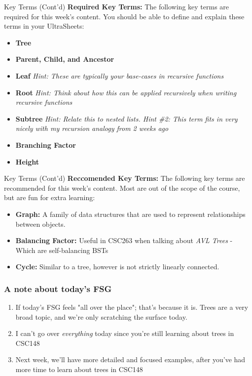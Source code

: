 \documentclass[hyperref={colorlinks,citecolor=blue,linkcolor=blue,urlcolor=blue}, aspectratio=1610]{beamer}
\begin{document}
\begin{frame}{Key Terms (Cont'd)}
  \textbf{Required Key Terms:} The following key terms are required for this week's content. You should be able to define and explain these terms in your UltraSheets\texttrademark{}:
  \begin{itemize}
    \item \textbf{Tree}
    \item \textbf{Parent, Child, and Ancestor}
    \item \textbf{Leaf} \textit{Hint: These are typically your base-cases in recursive functions}
    \item \textbf{Root} \textit{Hint: Think about how this can be applied recursively when writing recursive functions}
    \item \textbf{Subtree} \textit{Hint: Relate this to nested lists. Hint \#2: This term fits in very nicely with my recursion analogy from 2 weeks ago}
    \item \textbf{Branching Factor}
    \item \textbf{Height}
  \end{itemize}
\end{frame}

\begin{frame}{Key Terms (Cont'd)}
    \textbf{Reccomended Key Terms:} The following key terms are recommended for this week's content. Most are out of the scope of the course, but are fun for extra learning:

    \begin{itemize}
      \item \textbf{Graph: }A family of data structures that are used to represent relationships between objects.
      \item \textbf{Balancing Factor: }Useful in CSC263 when talking about \textit{AVL Trees} - Which are self-balancing BSTs
      \item \textbf{Cycle: }Similar to a tree, however is not strictly linearly connected.
    \end{itemize}
\end{frame}

\begin{frame}
  \frametitle{A note about today's FSG}
  \begin{enumerate}
    \item If today's FSG feels "all over the place"; that's because it is. Trees are a very broad topic, and we're only scratching the surface today.
    \item I can't go over \textit{everything} today since you're still learning about trees in CSC148
    \item Next week, we'll have more detailed and focused examples, after you've had more time to learn about trees in CSC148
  \end{enumerate}
\end{frame}
\end{document}
